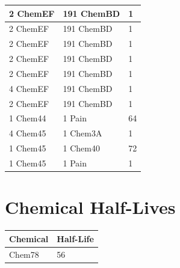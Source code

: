 \documentclass{article}
\begin{document}
\begin{longtable}{|p{4cm}|p{4cm}|p{2cm}|}
2 ChemEF & 191 ChemBD & 1 \\ \hline
2 ChemEF & 191 ChemBD & 1 \\ \hline
2 ChemEF & 191 ChemBD & 1 \\ \hline
2 ChemEF & 191 ChemBD & 1 \\ \hline
2 ChemEF & 191 ChemBD & 1 \\ \hline
4 ChemEF & 191 ChemBD & 1 \\ \hline
2 ChemEF & 191 ChemBD & 1 \\ \hline
1 Chem44 & 1 Pain & 64 \\ \hline
4 Chem45 & 1 Chem3A & 1 \\ \hline
1 Chem45 & 1 Chem40 & 72 \\ \hline
1 Chem45 & 1 Pain & 1 \\ \hline
\end{longtable}

\section*{Chemical Half-Lives}

\begin{longtable}{|p{4cm}|p{4cm}|}
\hline
{\bf Chemical} & {\bf Half-Life} \\ \hline
Chem78 & 56 \\ \hline
\end{longtable}
\end{document}
